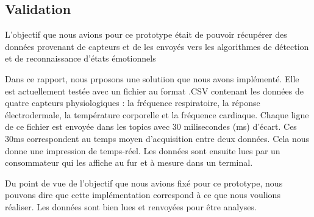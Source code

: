 \documentclass{article}
\begin{document}
	\subsection{Validation}
		L'objectif que nous avions pour ce prototype était de pouvoir récupérer des données provenant de capteurs et de les envoyés vers les algorithmes de détection et de reconnaissance d'états émotionnels\par
		Dans ce rapport, nous prposons une solutiion que nous avons implémenté.
		Elle est actuellement testée avec un fichier au format .CSV contenant les données de quatre capteurs physiologiques : la fréquence respiratoire, la réponse électrodermale, la température corporelle et la fréquence cardiaque.
		Chaque ligne de ce fichier est envoyée dans les topics avec 30 milisecondes (ms) d'écart.
		Ces 30ms correspondent au temps moyen d'acquisition entre deux données.
		Cela nous donne une impression de temps-réel.
		Les données sont ensuite lues par un consommateur qui les affiche au fur et à mesure dans un terminal.\par
		Du point de vue de l'objectif que nous avions fixé pour ce prototype, nous pouvons dire que cette implémentation correspond à ce que nous voulions réaliser.
		Les données sont bien lues et renvoyées pour être analyses.
			
\end{document}

